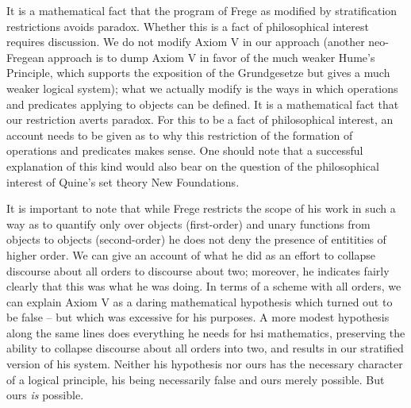 \documentclass{article}
\begin{document}
{{It is a mathematical fact that the program of Frege as modified by stratification restrictions avoids paradox.  Whether this is a fact of philosophical interest requires discussion.  We do not modify Axiom V in our approach (another neo-Fregean approach is to dump Axiom V in favor of the much weaker Hume's Principle, which supports the exposition of the Grundgesetze but gives a much weaker logical system);  what we actually modify is the ways in which operations and predicates applying to objects can be defined.  It is a mathematical fact that our restriction averts paradox.  For this to be a fact of philosophical interest, an account needs to be given as to why this restriction of the formation of operations and predicates makes sense.  One should note that a successful explanation of this kind would also bear on the question of the philosophical interest of Quine's set theory New Foundations.

It is important to note that while Frege restricts the scope of his work in such a way as to quantify only over objects (first-order) and unary functions from objects to objects (second-order) he does not deny the presence of entitities of higher order.  We can give an account of what he did as an effort to collapse discourse about all orders to discourse about two;  moreover, he indicates fairly clearly that this was what he was doing.  In terms of a scheme with all orders, we can explain Axiom V as a daring mathematical hypothesis which turned out to be false -- but which was excessive for his purposes.  A more modest hypothesis along the same lines does everything he needs for hsi mathematics, preserving the ability to collapse discourse about all orders into two, and results in our stratified version of his system.  Neither his hypothesis nor ours has the necessary character of a logical principle, his being necessarily false and ours merely possible.  But ours {\em is\/} possible.

}}
\end{document}
